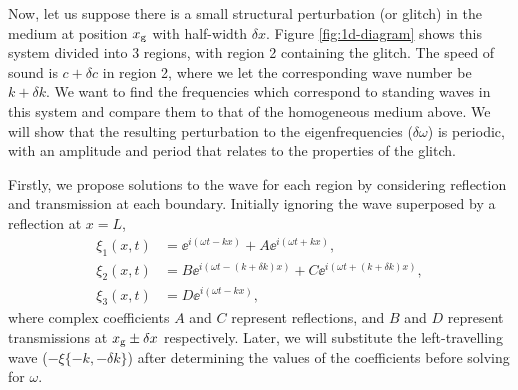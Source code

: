 Now, let us suppose there is a small structural perturbation (or glitch) in the medium at position \(x_{{\mathrm{g}}}\) with half-width \(\delta x\). Figure \ref{fig:1d-diagram} shows this system divided into 3 regions, with region 2 containing the glitch. The speed of sound is \(c + \delta c\) in region 2, where we let the corresponding wave number be \(k + \delta k\). We want to find the frequencies which correspond to standing waves in this system and compare them to that of the homogeneous medium above. We will show that the resulting perturbation to the eigenfrequencies (\(\delta\omega\)) is periodic, with an amplitude and period that relates to the properties of the glitch.

Firstly, we propose solutions to the wave for each region by considering reflection and transmission at each boundary. Initially ignoring the wave superposed by a reflection at \(x=L\),
%
\begin{align}
    \xi_1(x, t) &= \ee^{i(\omega t - k x)} + A \ee^{i(\omega t + k x)}, \label{eq:xi1-r} \\
    \xi_2(x, t) &= B\ee^{i(\omega t - (k + \delta k) x)} + C \ee^{i(\omega t + (k + \delta k) x)}, \label{eq:xi2-r} \\
    \xi_3(x, t) &= D \ee^{i(\omega t - k x)}, \label{eq:xi3-r}
\end{align}
%
where complex coefficients \(A\) and \(C\) represent reflections, and \(B\) and \(D\) represent transmissions at \(x_{{\mathrm{g}}} \pm \delta x\) respectively. Later, we will substitute the left-travelling wave (\(- \xi\{-k, -\delta k\}\)) after determining the values of the coefficients before solving for \(\omega\).

